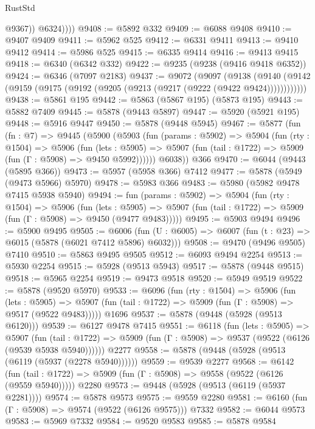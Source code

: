 \begin{lexlean}{RustStd}
\begin{coremodule}
                @9367))
            @6324))))
@9408 := @5892 @332
@9409 := @6088 @9408
@9410 := @9407 @9409
@9411 := @5962 @525
@9412 := @6331 @9411
@9413 := @9410 @9412
@9414 := @5986 @525
@9415 := @6335 @9414
@9416 := @9413 @9415
@9418 := @6340 (@6342 @332)
@9422 := @9235 (@9238 (@9416 @9418 @6352))
@9424 := @6346 (@7097 @2183)
@9437 := @9072
    (@9097
      (@9138 (@9140 (@9142 (@9159 (@9175 (@9192 (@9205 (@9213 (@9217 (@9222 (@9422 @9424))))))))))))
@9438 := @5861 @195
@9442 := @5863 (@5867 @195) (@5873 @195)
@9443 := @5882 @7409
@9445 := @5878 (@9443 @5897)
@9447 := @5920 (@5921 @195)
@9448 := @5916 @9447
@9450 := @5878 (@9448 @5945)
@9467 := @5877
    (fun (fn : @7) =>
    @9445
      (@5900
        (@5903
          (fun (params : @5902) =>
          @5904
            (fun (rty : @1504) =>
            @5906
              (fun (lets : @5905) =>
              @5907 (fun (tail : @1722) => @5909 (fun (Γ : @5908) => @9450 @5992))))))
        @6038))
    @366
@9470 := @6044 (@9443 (@5895 @366))
@9473 := @5957 (@5958 @366) @7412
@9477 := @5878 (@5949 (@9473 @5966) @5970)
@9478 := @5983 @366
@9483 := @5980 (@5982 @9478 @7415 @5938 @5940)
@9494 := fun (params : @5902) =>
  @5904
    (fun (rty : @1504) =>
    @5906
      (fun (lets : @5905) =>
      @5907 (fun (tail : @1722) => @5909 (fun (Γ : @5908) => @9450 (@9477 @9483)))))
@9495 := @5903 @9494
@9496 := @5900 @9495
@9505 := @6006 (fun (U : @6005) => @6007 (fun (t : @23) => @6015 (@5878 (@6021 @7412 @5896) @6032)))
@9508 := @9470 (@9496 @9505) @7410
@9510 := @5863 @9495 @9505
@9512 := @6093 @9494 @2254
@9513 := @5930 @2254
@9515 := @5928 (@9513 @5943)
@9517 := @5878 (@9448 @9515)
@9518 := @5965 @2254
@9519 := @9473 @9518
@9520 := @5949 @9519
@9522 := @5878 (@9520 @5970)
@9533 := @6096
    (fun (rty : @1504) =>
    @5906
      (fun (lets : @5905) =>
      @5907 (fun (tail : @1722) => @5909 (fun (Γ : @5908) => @9517 (@9522 @9483)))))
    @1696
@9537 := @5878 (@9448 (@5928 (@9513 @6120)))
@9539 := @6127 @9478 @7415
@9551 := @6118
    (fun (lets : @5905) =>
    @5907
      (fun (tail : @1722) => @5909 (fun (Γ : @5908) => @9537 (@9522 (@6126 (@9539 @5938 @5940))))))
    @2277
@9558 := @5878 (@9448 (@5928 (@9513 (@6119 (@5937 (@2278 @5940))))))
@9559 := @9539 @2277
@9568 := @6142
    (fun (tail : @1722) => @5909 (fun (Γ : @5908) => @9558 (@9522 (@6126 (@9559 @5940)))))
    @2280
@9573 := @9448 (@5928 (@9513 (@6119 (@5937 @2281))))
@9574 := @5878 @9573
@9575 := @9559 @2280
@9581 := @6160 (fun (Γ : @5908) => @9574 (@9522 (@6126 @9575))) @7332
@9582 := @6044 @9573
@9583 := @5969 @7332
@9584 := @9520 @9583
@9585 := @5878 @9584

\end{coremodule}
\end{lexlean}

